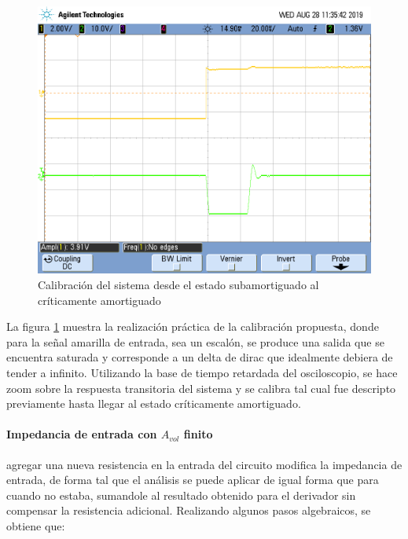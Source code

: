 \begin{figure}[H]
	\includegraphics[scale=0.2]{../EJ4/Derivador/Mediciones/Osciloscopio/PCB_Compensado/Calibracion/scope_15.png} 
	\caption{Calibraci\'on del sistema desde el estado subamortiguado al cr\'iticamente amortiguado}
	\label{fig:calibracion_derivador}
\end{figure}

La figura \ref{fig:calibracion_derivador} muestra la realizaci\'on pr\'actica de la calibraci\'on propuesta, donde para la se\~nal amarilla de entrada, sea un escal\'on,
se produce una salida que se encuentra saturada y corresponde a un delta de dirac que idealmente debiera de tender a infinito. Utilizando la base de tiempo retardada del osciloscopio, se hace
zoom sobre la respuesta transitoria del sistema y se calibra tal cual fue descripto previamente hasta llegar al estado cr\'iticamente amortiguado.

\paragraph*{Impedancia de entrada con $A_{vol}$ finito} agregar una nueva resistencia en la entrada del circuito modifica la impedancia de entrada, de forma tal que el an\'alisis se puede aplicar de igual forma que para cuando no estaba, sumandole al resultado obtenido para el derivador sin compensar la resistencia adicional. Realizando algunos pasos algebraicos, se obtiene que:

